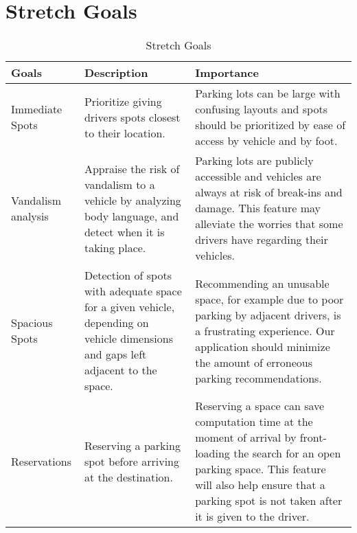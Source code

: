 \documentclass[12pt,letterpaper]{article}
\begin{document}
\section{Stretch Goals}
\begin{table}[hp]
\begin{tabularx}{\textwidth}{|X|X|X|}
\toprule
\textbf{Goals} & \textbf{Description} & \textbf{Importance}\\
\midrule
Immediate Spots & Prioritize giving drivers spots closest to their location. &
Parking lots can be large with confusing layouts and spots should be prioritized
by ease of access by vehicle and by foot. \\
\hline
Vandalism analysis & Appraise the risk of vandalism to a vehicle by analyzing
body language, and detect when it is taking place. & Parking lots are publicly
accessible and vehicles are always at risk of break-ins and damage. This feature
may alleviate the worries that some drivers have regarding their vehicles. \\
\hline
Spacious Spots & Detection of spots with adequate space for a given vehicle,
depending on vehicle dimensions and gaps left adjacent to the space. &
Recommending an unusable space, for example due to poor parking by adjacent
drivers, is a frustrating experience. Our application should minimize the amount
of erroneous parking recommendations.\\
\hline
Reservations & Reserving a parking spot before arriving at the destination. &
Reserving a space can save computation time at the moment of arrival by
front-loading the search for an open parking space. This feature will also help
ensure that a parking spot is not taken after it is given to the driver.\\
\bottomrule
\end{tabularx}
\caption{Stretch Goals} \label{TblStretchGoals}
\end{table}
\end{document}
